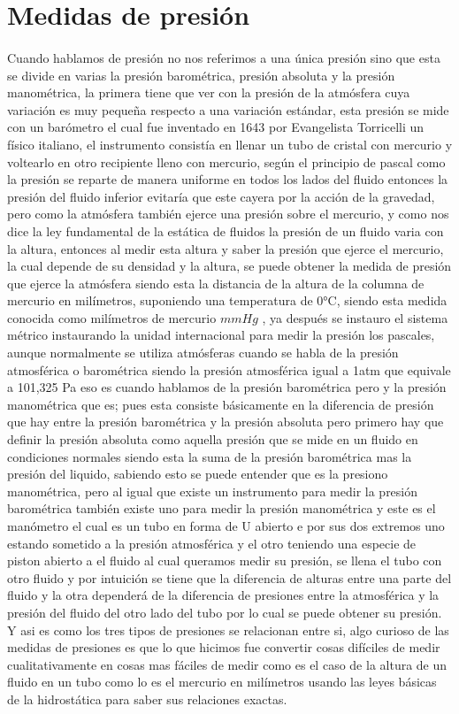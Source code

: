 \documentclass{article}
\begin{document}
\section*{Medidas de presión}
\paragraph*{}
Cuando hablamos de presión no nos referimos a una única presión sino que esta se divide en varias
la presión barométrica, presión absoluta y la presión manométrica, la primera tiene que ver con la presión
de la atmósfera cuya variación es muy pequeña respecto a una variación estándar, esta presión se mide con un 
barómetro el cual fue inventado en 1643 por Evangelista Torricelli un físico italiano, el instrumento consistía 
en llenar un tubo de cristal con mercurio y voltearlo en otro recipiente lleno con mercurio, según el principio de 
pascal como la presión se reparte de manera uniforme en todos los lados del fluido entonces la presión del fluido
inferior evitaría que este cayera por la acción de la gravedad, pero como la atmósfera también ejerce una presión
sobre el mercurio, y como nos dice la ley fundamental de la estática de fluidos la presión de un fluido
varia con la altura, entonces al medir esta altura y saber la presión que ejerce el mercurio, la cual depende
de su densidad y la altura, se puede obtener la medida de presión que ejerce la atmósfera siendo esta
la distancia de la altura de la columna de mercurio en milímetros, suponiendo una temperatura de 0°C,
siendo esta medida conocida como milímetros de mercurio $mmHg$ , ya después se instauro el sistema métrico 
instaurando la unidad internacional 
para medir la presión los pascales, aunque normalmente se utiliza atmósferas cuando se habla de la
presión atmosférica o barométrica siendo la presión atmosférica igual a 1atm que equivale a 101,325 Pa
eso es cuando hablamos de la presión barométrica pero y la presión manométrica que es;
pues esta consiste básicamente en la diferencia de presión que hay entre la presión barométrica y la presión 
absoluta pero primero hay que definir la presión absoluta como aquella presión que se mide en un fluido en condiciones
normales siendo esta la suma de la presión barométrica mas la presión del liquido, sabiendo esto se puede entender que es la 
presiono manométrica, pero al igual que existe un instrumento para medir la presión barométrica también existe
uno para medir la presión manométrica y este es el manómetro el cual es un tubo en forma de U abierto e por sus dos extremos
uno estando sometido a la presión atmosférica y el otro teniendo una especie de piston abierto a el fluido
al cual queramos medir su presión, se llena el tubo con otro fluido y por intuición se tiene que la 
diferencia de alturas entre una parte del fluido y la otra dependerá de la diferencia de presiones entre la atmosférica y la presión del fluido
del otro lado del tubo por lo cual se puede obtener su presión.
Y asi es como los tres tipos de presiones se relacionan entre si, algo curioso de las medidas de presiones es que lo que hicimos
fue convertir cosas difíciles de medir cualitativamente en cosas mas fáciles de medir como es el caso de la altura de un fluido en un tubo 
como lo es el mercurio en milímetros usando las leyes básicas de la hidrostática para saber sus relaciones exactas.
\end{document}
